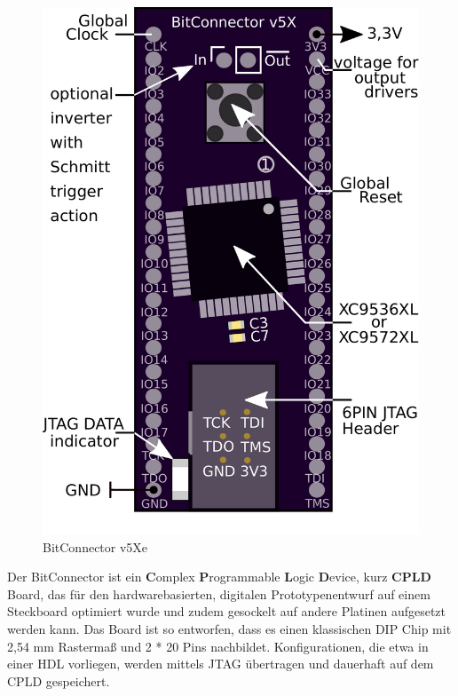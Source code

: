 \documentclass{article}
\begin{document}
\vspace{0.5cm}


\begin{figure}
		\vspace { -15pt }
	\includegraphics[scale=0.3]{BitConnector6P} 
	\caption{BitConnector v5Xe}
	\label{fig:}
\end{figure}

Der BitConnector ist ein \textbf{C}omplex \textbf{P}rogrammable \textbf{L}ogic \textbf{D}evice, kurz \textbf{CPLD} Board, das für den  hardwarebasierten, digitalen Prototypenentwurf auf einem Steckboard optimiert wurde und zudem gesockelt auf andere Platinen aufgesetzt werden kann. Das Board ist so entworfen, dass es einen klassischen DIP Chip mit 2,54 mm Rastermaß und 2 * 20 Pins nachbildet. Konfigurationen, die etwa in einer HDL vorliegen, werden mittels JTAG übertragen und dauerhaft auf dem CPLD gespeichert.
 
\end{document}
